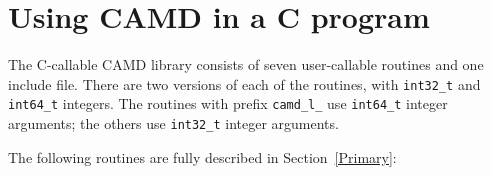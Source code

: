 \documentclass[11pt]{article}
\begin{document}
\section{Using CAMD in a C program}
\label{Cversion}

The C-callable CAMD library consists of seven user-callable routines and one
include file.  There are two versions of each of the routines, with
\verb'int32_t' and \verb'int64_t' integers.
The routines with prefix
{\tt camd\_l\_} use \verb'int64_t' integer arguments; the others use
\verb'int32_t' integer arguments.

The following routines are fully described in Section~\ref{Primary}:
\end{document}
